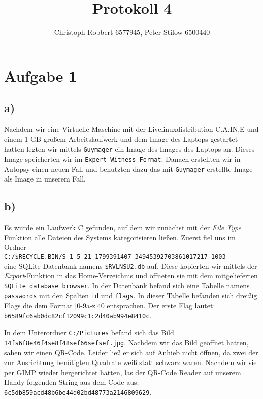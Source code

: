 \documentclass[10pt,a4paper]{article}
\author{Christoph Robbert 6577945, Peter Stilow 6500440}
\title{Protokoll 4}
\begin{document}
\maketitle
 
\section*{Aufgabe 1}

\subsection*{a)}

Nachdem wir eine Virtuelle Maschine mit der Livelinuxdistribution C.A.IN.E und einem 1 GB großem Arbeitslaufwerk und dem Image des Laptops gestartet hatten legten wir mittels \texttt{Guymager} ein Image des Images des Laptops an. Dieses Image speicherten wir im \texttt{Expert Witness Format}. Danach erstellten wir in Autopsy einen neuen Fall und benutzten dazu das mit \texttt{Guymager} erstellte Image als Image in unserem Fall.

\subsection*{b)}

Es wurde ein Laufwerk C gefunden, auf dem wir zunächst mit der \textit{File Type} Funktion alle Dateien des Systems kategorisieren ließen. Zuerst fiel uns im Ordner\\
\texttt{C:/\$RECYCLE.BIN/S-1-5-21-1799391407-34945392703861017217-1003}\\
eine SQLite Datenbank namens \texttt{\$RVLNSU2.db} auf. Diese kopierten wir mittels der \textit{Export}-Funktion in das Home-Verzeichnis und öffneten sie mit dem mitgelieferten \texttt{SQLite database browser}. In der Datenbank befand sich eine Tabelle namens \texttt{passwords} mit den Spalten \texttt{id} und \texttt{flags}. In dieser Tabelle befanden sich dreißig Flags die dem Format [0-9a-z]{40} entsprachen. Der erste Flag lautet:
\texttt{b6589fc6ab0dc82cf12099c1c2d40ab994e8410c}.

In dem Unterordner \texttt{C:/Pictures} befand sich das Bild \texttt{14fs6f8e46f4se8f48sef66sefsef.jpg}. Nachdem wir das Bild geöffnet hatten, sahen wir einen QR-Code. Leider ließ er sich auf Anhieb nicht öffnen, da zwei der zur Ausrichtung benötigten Quadrate weiß statt schwarz waren. Nachdem wir sie per GIMP wieder hergerichtet hatten, las der QR-Code Reader auf unserem Handy folgenden String aus dem Code aus:
\\\texttt{6c5db859acd48b6be44d02bd48773a2146809629}.
\end{document}
